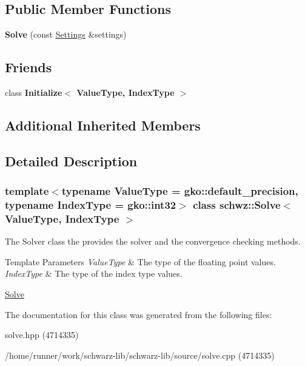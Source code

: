 \subsection*{Public Member Functions}
\begin{DoxyCompactItemize}
\item 
\mbox{\label{classschwz_1_1Solve_a24250987949518cc92649066d3ce147d}} 
{\bfseries Solve} (const \hyperlink{structschwz_1_1Settings}{Settings} \&settings)
\end{DoxyCompactItemize}
\subsection*{Friends}
\begin{DoxyCompactItemize}
\item 
\mbox{\label{classschwz_1_1Solve_a7044b349fe5363eeace2d1a56b38f650}} 
class {\bfseries Initialize$<$ Value\+Type, Index\+Type $>$}
\end{DoxyCompactItemize}
\subsection*{Additional Inherited Members}


\subsection{Detailed Description}
\subsubsection*{template$<$typename Value\+Type = gko\+::default\+\_\+precision, typename Index\+Type = gko\+::int32$>$\newline
class schwz\+::\+Solve$<$ Value\+Type, Index\+Type $>$}

The Solver class the provides the solver and the convergence checking methods. 


\begin{DoxyTemplParams}{Template Parameters}
{\em Value\+Type} & The type of the floating point values. \\
\hline
{\em Index\+Type} & The type of the index type values.\\
\hline
\end{DoxyTemplParams}
\hyperlink{group__solve}{Solve} 

The documentation for this class was generated from the following files\+:\begin{DoxyCompactItemize}
\item 
solve.\+hpp (4714335)\item 
/home/runner/work/schwarz-\/lib/schwarz-\/lib/source/solve.\+cpp (4714335)\end{DoxyCompactItemize}
